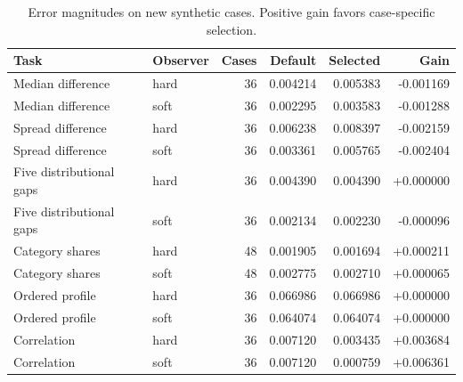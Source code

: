 \begin{longtable}{llrrrr}
\caption{Error magnitudes on new synthetic cases. Positive gain favors case-specific selection.}\label{tab:synthetic-losses}\\
\toprule Task & Observer & Cases & Default & Selected & Gain\\\midrule\endhead
Median difference & hard & 36 & 0.004214 & 0.005383 & -0.001169\\
Median difference & soft & 36 & 0.002295 & 0.003583 & -0.001288\\
Spread difference & hard & 36 & 0.006238 & 0.008397 & -0.002159\\
Spread difference & soft & 36 & 0.003361 & 0.005765 & -0.002404\\
Five distributional gaps & hard & 36 & 0.004390 & 0.004390 & +0.000000\\
Five distributional gaps & soft & 36 & 0.002134 & 0.002230 & -0.000096\\
Category shares & hard & 48 & 0.001905 & 0.001694 & +0.000211\\
Category shares & soft & 48 & 0.002775 & 0.002710 & +0.000065\\
Ordered profile & hard & 36 & 0.066986 & 0.066986 & +0.000000\\
Ordered profile & soft & 36 & 0.064074 & 0.064074 & +0.000000\\
Correlation & hard & 36 & 0.007120 & 0.003435 & +0.003684\\
Correlation & soft & 36 & 0.007120 & 0.000759 & +0.006361\\
\bottomrule\end{longtable}